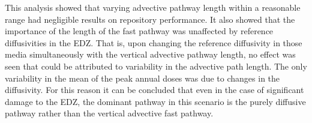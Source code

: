 This analysis showed that varying advective pathway length within a reasonable 
range had negligible results on repository performance. It also showed that the 
importance of the length of the fast pathway was unaffected by reference 
diffusivities in the \gls{EDZ}. That is, upon changing the reference diffusivity 
in those media simultaneously with the vertical advective pathway length, no 
effect was seen that could be attributed to variability in the advective path 
length. The only variability in the mean of the peak annual doses was due to 
changes in the diffusivity. For this reason it can be concluded that even in the 
case of significant damage to the \gls{EDZ}, the dominant pathway in this 
scenario is the purely diffusive pathway rather than the vertical advective fast 
pathway.
